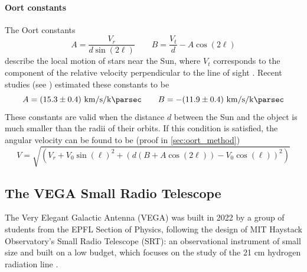 \paragraph{Oort constants} The Oort constants
\begin{equation}
    A = \frac{V_r}{d \sin(2\ell)} \qquad B = \frac{V_t}{d} - A \cos(2\ell)
\end{equation}
describe the local motion of stars near the Sun, where $V_t$ corresponds to the component of the relative velocity perpendicular to the line of sight \cite{carroll_introduction_2007}. Recent studies (see \cite{bovy_galactic_2017}) estimated these constants to be
\begin{equation*}
    A = (15.3 \pm 0.4) \ \si{\kilo\meter\per\second\per\kilo\parsec} \qquad B = -(11.9 \pm 0.4) \ \si{\kilo\meter\per\second\per\kilo\parsec}
\end{equation*}
These constants are valid when the distance $d$ between the Sun and the object is much smaller than the radii of their orbits. If this condition is satisfied, the angular velocity can be found to be (proof in \autoref{sec:oort_method})
\begin{equation*}
    V = \sqrt{(V_r + V_0 \sin(\ell)^2 + (d(B + A\cos(2\ell)) - V_0 \cos(\ell))^2)}
\end{equation*}

\subsection{The VEGA Small Radio Telescope}
The Very Elegant Galactic Antenna (VEGA) was built in 2022 by a group of students from the EPFL Section of Physics, following the design of MIT Haystack Observatory's Small Radio Telescope (SRT): an observational instrument of small size and built on a low budget, which focuses on the study of the 21 cm hydrogen radiation line \cite{interdisciplinary_project_2022}.

